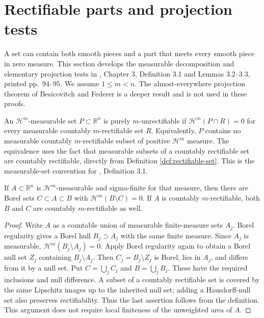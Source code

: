 \chapter{Rectifiable parts and projection tests}\label{sec:rectifiable-projection-structure}
A set can contain both smooth pieces and a part that meets every smooth piece in zero measure. This section develops the measurable decomposition and elementary projection tests in \cite{Sim18}, Chapter 3, Definition 3.1 and Lemmas 3.2--3.3, printed pp.~94--95. We assume $1\leq m<n$. The almost-everywhere projection theorem of Besicovitch and Federer is a deeper result and is not used in these proofs.

\begin{definition}\label{def:pure-unrectifiable-set}
An $\mathcal H^m$-measurable set $P\subset\mathbb R^n$ is purely $m$-unrectifiable if $\mathcal H^m(P\cap R)=0$ for every measurable countably $m$-rectifiable set $R$. Equivalently, $P$ contains no measurable countably $m$-rectifiable subset of positive $\mathcal H^m$ measure. The equivalence uses the fact that measurable subsets of a countably rectifiable set are countably rectifiable, directly from Definition \ref{def:rectifiable-set}. This is the measurable-set convention for \cite{Sim18}, Definition 3.1.
\end{definition}

\begin{lemma}\label{lem:hausdorff-borel-core}
If $A\subset\mathbb R^n$ is $\mathcal H^m$-measurable and sigma-finite for that measure, then there are Borel sets $C\subset A\subset B$ with $\mathcal H^m(B\setminus C)=0$. If $A$ is countably $m$-rectifiable, both $B$ and $C$ are countably $m$-rectifiable as well.
\end{lemma}
\begin{proof}
Write $A$ as a countable union of measurable finite-measure sets $A_j$. Borel regularity gives a Borel hull $B_j\supset A_j$ with the same finite measure. Since $A_j$ is measurable, $\mathcal H^m(B_j\setminus A_j)=0$. Apply Borel regularity again to obtain a Borel null set $Z_j$ containing $B_j\setminus A_j$. Then $C_j=B_j\setminus Z_j$ is Borel, lies in $A_j$, and differs from it by a null set. Put $C=\bigcup_j C_j$ and $B=\bigcup_j B_j$. These have the required inclusions and null difference. A subset of a countably rectifiable set is covered by the same Lipschitz images up to the inherited null set; adding a Hausdorff-null set also preserves rectifiability. Thus the last assertion follows from the definition. This argument does not require local finiteness of the unweighted area of $A$.
\end{proof}

